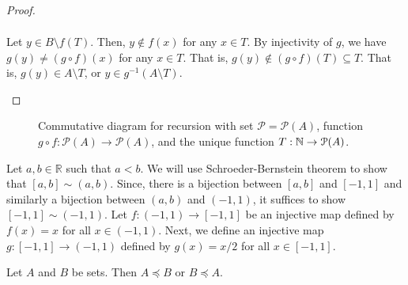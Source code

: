 \documentclass[a4paper,english,12pt]{article}   	%
\begin{document}
\begin{proof}
\begin{description}
\begin{align*}
\end{align*}
Let $y \in B \setminus f(T)$. Then, $y \notin f(x)$ for any $x \in T$. By injectivity of $g$, we have $g(y) \neq (g \circ f)(x)$ for any $x \in T$. That is, $g(y) \notin (g \circ f)(T) \subseteq T$. That is, $g(y) \in A \setminus T$, or $y \in g^{-1}(A \setminus T)$.
\end{description}
\end{proof}

\begin{figure}[hhhh]
\centering
\scalebox{1}{}
\caption{Commutative diagram for recursion with set $\mathcal{P} = \mathcal{P}(A)$, function $g \circ f: \mathcal{P}(A) \to \mathcal{P}(A)$, and the unique function $T: \mathbb{N} \to \mathcal{P}(A)$.}
\label{Fig:SchroederBernstein}
\end{figure}

\begin{exmp} Let $a, b \in \mathbb{R}$ such that $a < b$. We will use Schroeder-Bernstein theorem to show that $[a,b] \sim (a,b)$. Since, there is a bijection between $[a,b]$ and $[-1,1]$ and similarly a bijection between $(a,b)$ and $(-1,1)$, it suffices to show $[-1,1] \sim (-1,1)$. Let $f \colon (-1,1) \to [-1,1]$ be an injective map defined by $f(x) = x$ for all $x \in (-1,1)$.%
Next, we define an injective map $g \colon [-1,1] \to (-1,1)$ defined by $g(x) = x/2$ for all $x \in [-1,1]$.
\end{exmp}
\begin{thm} Let $A$ and $B$ be sets. Then $A \preccurlyeq B $ or $B \preccurlyeq A$.
\end{thm}
\end{document}
